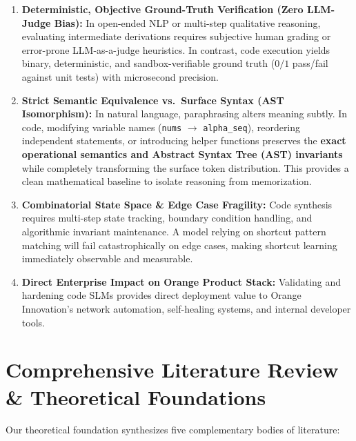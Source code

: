 \documentclass[12pt, a4paper]{article}
\begin{document}
\begin{domainbox}[title={\faCode\ Foundational Rationale: Why Code is the Optimal Scientific Laboratory}]
\begin{enumerate}[leftmargin=1.5em]
  \item \textbf{Deterministic, Objective Ground-Truth Verification (Zero LLM-Judge Bias):}
  In open-ended NLP or multi-step qualitative reasoning, evaluating intermediate derivations requires subjective human grading or error-prone LLM-as-a-judge heuristics. In contrast, code execution yields binary, deterministic, and sandbox-verifiable ground truth ($0/1$ pass/fail against unit tests) with microsecond precision.
  
  \item \textbf{Strict Semantic Equivalence vs.\ Surface Syntax (AST Isomorphism):}
  In natural language, paraphrasing alters meaning subtly. In code, modifying variable names (\texttt{nums} $\to$ \texttt{alpha\_seq}), reordering independent statements, or introducing helper functions preserves the \textbf{exact operational semantics and Abstract Syntax Tree (AST) invariants} while completely transforming the surface token distribution. This provides a clean mathematical baseline to isolate reasoning from memorization.
  
  \item \textbf{Combinatorial State Space \& Edge Case Fragility:}
  Code synthesis requires multi-step state tracking, boundary condition handling, and algorithmic invariant maintenance. A model relying on shortcut pattern matching will fail catastrophically on edge cases, making shortcut learning immediately observable and measurable.
  
  \item \textbf{Direct Enterprise Impact on Orange Product Stack:}
  Validating and hardening code SLMs provides direct deployment value to Orange Innovation's network automation, self-healing systems, and internal developer tools.
\end{enumerate}
\end{domainbox}

\section{Comprehensive Literature Review \& Theoretical Foundations}

Our theoretical foundation synthesizes five complementary bodies of literature:
\end{document}
